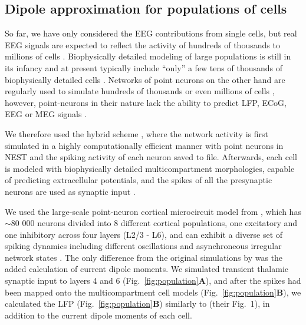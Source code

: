 \documentclass[preprint,10pt,authoryear]{elsarticle}
\begin{document}
\subsection{Dipole approximation for populations of cells}\label{subsec:populations}
So far, we have only considered the EEG contributions from single cells, but real EEG signals are expected to reflect the activity of hundreds of thousands to millions of cells \citep{NUNEZ2006, COHEN2017}. 
Biophysically detailed modeling of large populations is still in its infancy \citep{EINEVOLL2019} and at present typically include ``only'' a few tens of thousands of biophysically detailed cells \citep{MARKRAM2015, BILLEH2019}. Networks of point neurons on the other hand are regularly used to simulate hundreds of thousands \citep{BILLEH2019} or even millions of cells \citep{SENK2018, SCHMIDT2018}, however, point-neurons in their nature lack the ability to predict LFP, ECoG, EEG or MEG signals \citep{EINEVOLL2013REVIEW}.  

We therefore used the hybrid scheme \citep{HAGEN2016, SENK2018, Skaar2020}, where the network activity is first simulated in a highly computationally efficient manner with point neurons in NEST \citep{NEST} and the spiking activity of each neuron saved to file. Afterwards, each cell is modeled with biophysically detailed multicompartment morphologies, capable of predicting extracellular potentials, and the spikes of all the presynaptic neurons are used as synaptic input \citep{HAGEN2016, SENK2018}.

We used the large-scale point-neuron cortical microcircuit model from \cite{POTJANS2014, HAGEN2016}, which has $\sim$80 000 neurons divided into 8 different cortical populations, one excitatory and one inhibitory across four layers (L2/3 - L6), and can exhibit a diverse set of spiking dynamics including different oscillations and asynchroneous irregular network states \citep{HAGEN2016, BRUNEL2000}. 
The only difference from the original simulations by \cite{HAGEN2016} was the added calculation of current dipole moments.
We simulated transient thalamic synaptic input to layers 4 and 6 (Fig.~\ref{fig:population}\textbf{A}), and after the spikes had been mapped onto the multicompartment cell models (Fig.~\ref{fig:population}\textbf{B}), we calculated the LFP (Fig.~\ref{fig:population}\textbf{B}) similarly to \cite{HAGEN2016} (their Fig.~1), in addition to the current dipole moments of each cell.
\end{document}
